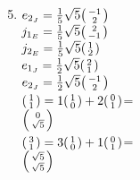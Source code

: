 \documentclass[../main.tex]{subfiles}
\begin{document}
\begin{antwoord}[-9cm]
\begin{enumerate}[left=-3pt]
\setcounter{enumi}{4}\item $e_{2_J}=\tfrac{1}{5}\sqrt{5}\smqty(-1\\2)$\\
$j_{1_E}=\tfrac{1}{5}\sqrt{5}\smqty(2\\-1)$\\
$j_{2_E}=\tfrac{1}{5}\sqrt{5}\smqty(1\\2)$\\
$e_{1_J}=\tfrac{1}{2}\sqrt{5}\smqty(2\\1)$\\
$e_{2_J}=\tfrac{1}{2}\sqrt{5}\smqty(-1\\2)$\\
$\smqty(1\\1)=1\smqty(1\\0)+2\smqty(0\\1)$=\\
$\smqty(0\\\sqrt{5})$\\
$\smqty(3\\1)=3\smqty(1\\0)+1\smqty(0\\1)$=\\
$\smqty(\sqrt{5}\\\sqrt{5})$
\end{enumerate}
\end{antwoord}
\end{document}
